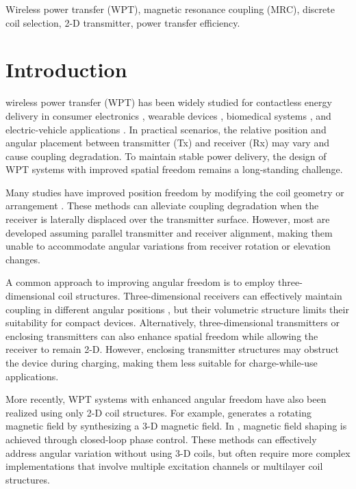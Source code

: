 \documentclass[journal]{IEEEtran}
\begin{document}
\begin{IEEEkeywords}
Wireless power transfer (WPT), magnetic resonance coupling (MRC), discrete coil selection, 2-D transmitter, power transfer efficiency.
\end{IEEEkeywords}





\section{Introduction}
 wireless power transfer (WPT) has been widely studied for contactless energy delivery in consumer electronics \cite{consumer}, wearable devices \cite{wearable}, biomedical systems \cite{bio}, and electric-vehicle applications \cite{ev}. In practical scenarios, the relative position and angular placement between transmitter (Tx) and receiver (Rx) may vary and cause coupling degradation. To maintain stable power delivery, the design of WPT systems with improved spatial freedom remains a long-standing challenge.

Many studies have improved position freedom by modifying the coil geometry \cite{geo1,geo3,geo4} or arrangement \cite{ar3,ar4}. These methods can alleviate coupling degradation when the receiver is laterally displaced over the transmitter surface. However, most are developed assuming parallel transmitter and receiver alignment, making them unable to accommodate angular variations from receiver rotation or elevation changes.

A common approach to improving angular freedom is to employ three-dimensional coil structures. Three-dimensional receivers can effectively maintain coupling in different angular positions \cite{3drx1,3drx3,3drx5}, but their volumetric structure limits their suitability for compact devices. Alternatively, three-dimensional transmitters \cite{comp2} or enclosing transmitters \cite{bowl,3D} can also enhance spatial freedom while allowing the receiver to remain 2-D. However, enclosing transmitter structures may obstruct the device during charging, making them less suitable for charge-while-use applications.

More recently, WPT systems with enhanced angular freedom have also been realized using only 2-D coil structures. For example, \cite{consu} generates a rotating magnetic field by synthesizing a 3-D magnetic field. In \cite{multi}, magnetic field shaping is achieved through closed-loop phase control. These methods can effectively address angular variation without using \mbox{3-D} coils, but often require more complex implementations that involve multiple excitation channels or multilayer coil structures.
\end{document}
